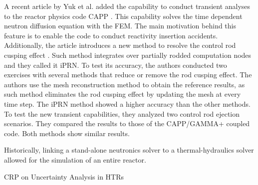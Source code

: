 \documentclass[11pt,letterpaper]{article}
\begin{document}
A recent article by Yuk et al. \cite{yuk_time-dependent_2020} added the capability to conduct transient analyses to the reactor physics code CAPP \cite{lee_development_2011}.
This capability solves the time dependent neutron diffusion equation with the \gls{FEM}.
The main motivation behind this feature is to enable the code to conduct reactivity insertion accidents.
Additionally, the article introduces a new method to resolve the control rod cusping effect \cite{joo_resolution_1984}.
Such method integrates over partially rodded computation nodes and they called it iPRN.
To test its accuracy, the authors conducted two exercises with several methods that reduce or remove the rod cusping effect.
The authors use the mesh reconstruction method to obtain the reference results, as such method eliminates the rod cusping effect by updating the mesh at every time step.
The iPRN method showed a higher accuracy than the other methods.
To test the new transient capabilities, they analyzed two control rod ejection scenarios.
They compared the results to those of the CAPP/GAMMA+ coupled code.
Both methods show similar results.







Historically, linking a stand-alone neutronics solver to a thermal-hydraulics solver allowed for the simulation of an entire reactor.

CRP on Uncertainty Analysis in HTRs %


\pagebreak


\end{document}

